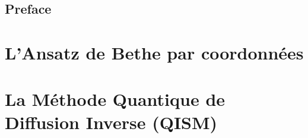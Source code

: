 



\makeatletter







\maketitle\\





\tableofcontents




\newpage


                
\chapter*{Preface}           


\part{L'Ansatz de Bethe par coordonnées}


\part{La Méthode Quantique de Diffusion Inverse (QISM)}






			            
